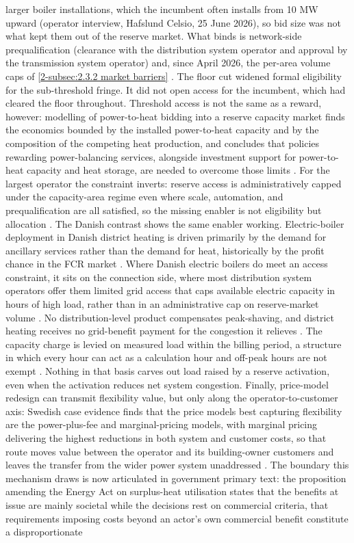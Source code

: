 larger boiler installations, which the incumbent often installs from 10 MW upward (operator interview, Hafslund Celsio, 25 June 2026), so bid size was not what kept them out of the reserve market. What binds is network-side prequalification (clearance with the distribution system operator and approval by the transmission system operator) and, since April 2026, the per-area volume caps of \autoref{2-subsec:2.3.2 market barriers} \cite{statnett_innforing_2026}. The floor cut widened formal eligibility for the sub-threshold fringe. It did not open access for the incumbent, which had cleared the floor throughout. Threshold access is not the same as a reward, however: modelling of power-to-heat bidding into a reserve capacity market finds the economics bounded by the installed power-to-heat capacity and by the composition of the competing heat production, and concludes that policies rewarding power-balancing services, alongside investment support for power-to-heat capacity and heat storage, are needed to overcome those limits \cite{monie_power--heat_2022}. For the largest operator the constraint inverts: reserve access is administratively capped under the capacity-area regime even where scale, automation, and prequalification are all satisfied, so the missing enabler is not eligibility but allocation \cite{statnett_innforing_2026}. The Danish contrast shows the same enabler working. Electric-boiler deployment in Danish district heating is driven primarily by the demand for ancillary services rather than the demand for heat, historically by the profit chance in the FCR market \cite{danish_energy_agency_technology_2024}. Where Danish electric boilers do meet an access constraint, it sits on the connection side, where most distribution system operators offer them limited grid access that caps available electric capacity in hours of high load, rather than in an administrative cap on reserve-market volume \cite{danish_energy_agency_technology_2024}. No distribution-level product compensates peak-shaving, and district heating receives no grid-benefit payment for the congestion it relieves \cite{Thema_fjernvarme_2024}. The capacity charge is levied on measured load within the billing period, a structure in which every hour can act as a calculation hour and off-peak hours are not exempt \cite{kirkerud_impacts_2016}. Nothing in that basis carves out load raised by a reserve activation, even when the activation reduces net system congestion. Finally, price-model redesign can transmit flexibility value, but only along the operator-to-customer axis: Swedish case evidence finds that the price models best capturing flexibility are the power-plus-fee and marginal-pricing models, with marginal pricing delivering the highest reductions in both system and customer costs, so that route moves value between the operator and its building-owner customers and leaves the transfer from the wider power system unaddressed \cite{lygnerud_capturing_2024}. The boundary this mechanism draws is now articulated in government primary text: the proposition amending the Energy Act on surplus-heat utilisation states that the benefits at issue are mainly societal while the decisions rest on commercial criteria, that requirements imposing costs beyond an actor's own commercial benefit constitute a disproportionate 
